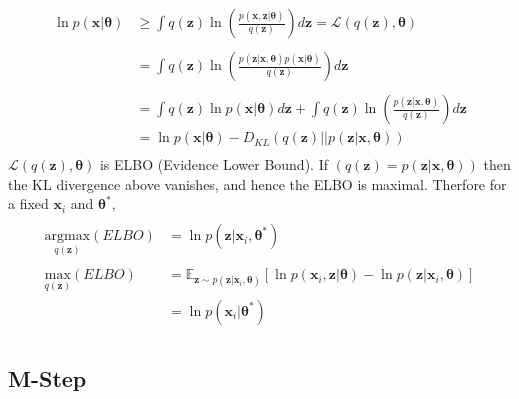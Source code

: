 \documentclass[a4]{article}
\begin{document}
\begin{equation}
\begin{aligned}
\ln p(\mathbf{x}|\bm{\theta}) &\ge 
    \int q(\mathbf{z}) \ln \left(
        \frac{ p(\mathbf{x},\mathbf{z}|\bm{\theta}) }
             { q(\mathbf{z}) }
    \right) d\mathbf{z} 
    = \mathcal{L} ( q(\mathbf{z}), \bm{\theta} ) \label{elbo}\\
\\
&= \int q(\mathbf{z}) \ln \left(
    \frac{ p(\mathbf{z}|\mathbf{x},\bm{\theta})p(\mathbf{x}|\bm{\theta}) }
         { q(\mathbf{z}) }
\right) d\mathbf{z}\\
\\
&= \int q(\mathbf{z}) \ln p(\mathbf{x}|\bm{\theta})d\mathbf{z} 
 +
   \int q(\mathbf{z}) \ln \left( \frac{ p(\mathbf{z}|\mathbf{x},\bm{\theta}) }
                                      { q(\mathbf{z})                        } \right)
d\mathbf{z}\\
&= \ln p(\mathbf{x}|\bm{\theta}) 
 - D_{KL}( q(\mathbf{z}) || p( \mathbf{z} | \mathbf{x}, \bm{\theta}) )
\\
\end{aligned}
\end{equation}
$\mathcal{L}(q(\mathbf{z}), \bm{\theta})$
is ELBO (Evidence Lower Bound).
If
$( q(\mathbf{z}) = p(\mathbf{z}|\mathbf{x},\bm{\theta}))$
then the KL divergence above vanishes, and hence the ELBO is maximal.
Therfore for a fixed $\mathbf{x}_i$ and $\bm{\theta^*}$,
\begin{equation}
\begin{aligned}
\\
    \underset{ q(\mathbf{z}) }{ \mathrm{argmax} }(ELBO)
&=
    \ln p(\mathbf{z}|\mathbf{x}_i,\bm{\theta^*})\\
\\
    \underset{ q(\mathbf{z}) }{ \mathrm{max} }(ELBO)
&=
    \mathbb{E}_{\mathbf{z}\sim p(\mathbf{z}|\mathbf{x}_i,\bm{\theta}) }[
        \ln p(  \mathbf{x}_i,\mathbf{z} | \bm{\theta} ) 
              - \ln p( \mathbf{z} | \mathbf{x}_i,\bm{\theta} )
    ]\\
&=
    \ln p( \mathbf{x}_i | \bm{\theta^*} ) 
\\
\end{aligned}
\end{equation}


\subsection{M-Step}
\end{document}

